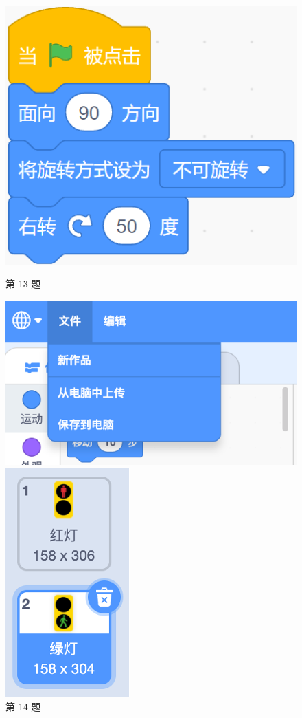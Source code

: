 \documentclass[10pt, a4paper]{article}
\begin{document}
\begin{enumerate}
        \begin{figure}[htbp]
            \begin{minipage}[t]{.24\textwidth}
                \centering
                \includegraphics[width=.6\textwidth]{13.png}
                \caption*{第 13 题}
            \end{minipage}
            \begin{minipage}[t]{.24\textwidth}
                \centering
                \includegraphics[width=.9\textwidth]{14.png}
                \caption*{第 14 题}
            \end{minipage}
            \begin{minipage}[t]{.2\textwidth}
                \centering
                \includegraphics[width=.4\textwidth]{15.png}

\end{minipage}
\end{figure}
\end{enumerate}
\end{document}
